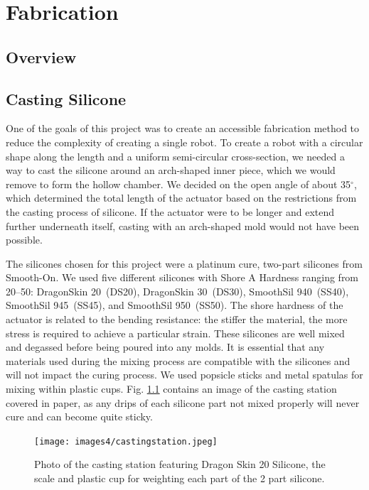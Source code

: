 \chapter{Fabrication}
\label{chapter:fabrication}

\section{Overview}


\section{Casting Silicone}

One of the goals of this project was to create an accessible fabrication method to reduce the complexity of creating a single robot. To create a robot with a circular shape along the length and a uniform semi-circular cross-section, we needed a way to cast the silicone around an arch-shaped inner piece, which we would remove to form the hollow chamber. We decided on the open angle of about 35$^\circ$, which determined the total length of the actuator based on the restrictions from the casting process of silicone. If the actuator were to be longer and extend further underneath itself, casting with an arch-shaped mold would not have been possible. 

The silicones chosen for this project were a platinum cure, two-part silicones from Smooth-On. We used five different silicones with Shore A Hardness ranging from 20--50: DragonSkin 20~(DS20), DragonSkin 30~(DS30), SmoothSil 940~(SS40), SmoothSil 945~(SS45), and SmoothSil 950~(SS50). The shore hardness of the actuator is related to the bending resistance: the stiffer the material, the more stress is required to achieve a particular strain. These silicones are well mixed and degassed before being poured into any molds. It is essential that any materials used during the mixing process are compatible with the silicones and will not impact the curing process. We used popsicle sticks and metal spatulas for mixing within plastic cups. Fig. \ref{fig:castingstation} contains an image of the casting station covered in paper, as any drips of each silicone part not mixed properly will never cure and can become quite sticky. 

\begin{figure}[ht]
    \centering
    \texttt{[image: images4/castingstation.jpeg]}
    \caption{Photo of the casting station featuring Dragon Skin 20 Silicone, the scale and plastic cup for weighting each part of the 2 part silicone.}
    \label{fig:castingstation}
\end{figure}

